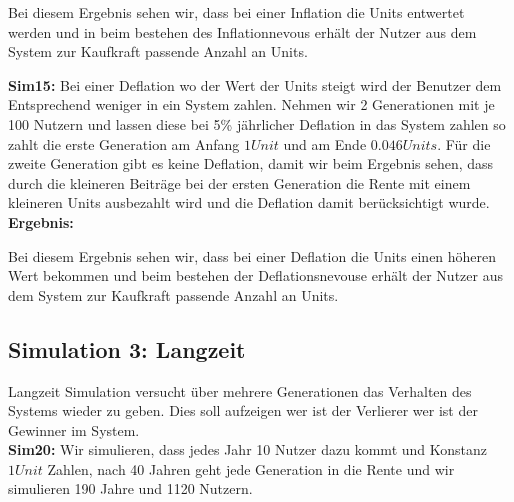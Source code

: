 Bei diesem Ergebnis sehen wir, dass bei einer Inflation die Units entwertet werden und in beim bestehen des Inflationnevous erhält der Nutzer aus dem System zur Kaufkraft passende Anzahl an Units.

\textbf{Sim15:} Bei einer Deflation wo der Wert der Units steigt wird der Benutzer dem Entsprechend weniger in ein System zahlen. Nehmen wir 2 Generationen mit je 100 Nutzern und lassen diese bei 5\% jährlicher Deflation in das System zahlen so zahlt die erste Generation am Anfang $1 Unit$  und am Ende $0.046 Units$. Für die zweite Generation gibt es keine Deflation, damit wir beim Ergebnis sehen, dass durch die kleineren Beiträge bei der ersten Generation die Rente mit einem kleineren Units ausbezahlt wird und die Deflation damit berücksichtigt wurde. \\

\textbf{Ergebnis:}

\begin{table}[hbt!]
\centering
{}
\end{table}

Bei diesem Ergebnis sehen wir, dass bei einer Deflation die Units einen höheren Wert bekommen und beim bestehen der Deflationsnevouse erhält der Nutzer aus dem System zur Kaufkraft passende Anzahl an Units.


\subsection{Simulation 3: Langzeit}

Langzeit Simulation versucht über mehrere Generationen das Verhalten des Systems wieder zu geben. Dies soll aufzeigen wer ist der Verlierer wer ist der Gewinner im System. \\

\textbf{Sim20:} Wir simulieren, dass jedes Jahr 10 Nutzer dazu kommt und Konstanz $1 Unit$ Zahlen, nach 40 Jahren geht jede Generation in die Rente und wir simulieren 190 Jahre und 1120 Nutzern. \\

